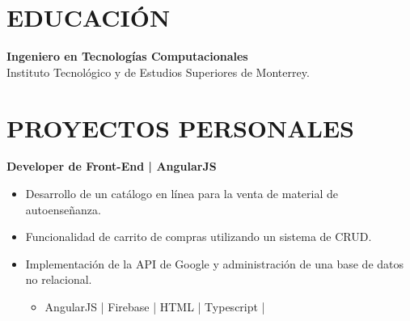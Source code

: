 \documentclass{res}
\begin{document}
\address{
}

\begin{resume}
    \separator

    \section{\large{EDUCACIÓN}} \jump
    \textbf{Ingeniero en Tecnologías Computacionales} \jump
     \\
    Instituto Tecnológico y de Estudios Superiores de Monterrey.
    
    \vspace{5mm}

    \section{\large{PROYECTOS PERSONALES}} \jump
    \textbf{Developer de Front-End | AngularJS} \jump
    \begin{itemize}
        \item Desarrollo de un catálogo en línea para la venta de material de autoenseñanza.
        \item Funcionalidad de carrito de compras utilizando un sistema de CRUD.
        \item Implementación de la API de Google y administración de una base de datos no relacional.
        \begin{itemize}
            \item AngularJS | Firebase | HTML | Typescript |
        \end{itemize}
    \end{itemize}
\end{resume}
\end{document}
